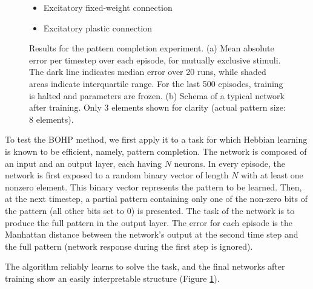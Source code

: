 \documentclass{article}
\begin{document}
\begin{figure}
\begin{subfigure}[t]{0.25\textwidth}
\end{subfigure}
\begin{minipage}[b]{0.25\textwidth}
\centering
\noindent
\begin{itemize}[leftmargin=*] %
\item[]\tikz{\path[very thick,->,draw=black] %
        (0,0) -- (1,0) ;}Excitatory fixed-weight connection
\item[]\tikz{\path[very thick,->,dashed,draw=black] %
        (0,0) -- (1,0) ;}Excitatory plastic connection
\end{itemize}
\end{minipage}
\caption{Results for the pattern completion experiment. (a) Mean absolute error per timestep over each episode, for mutually
exclusive stimuli. The dark line indicates median error
over 20 runs, while shaded areas indicate interquartile range. For the last 500
episodes, training is halted and parameters are frozen. (b) Schema of a
typical network after training. Only 3 elements shown for clarity (actual
pattern size: 8 elements). }
\label{fig:completion}
\end{figure}


To test the BOHP method, we first apply it to a task for which 
Hebbian learning is known to be efficient, namely, pattern completion. The
network is composed of an input and an output layer, each having $N$ neurons.
In every
episode, the network is first exposed to a random binary vector of length $N$
with at least one nonzero element. This binary vector represents the pattern to
be learned.
Then, at the next timestep, a partial pattern containing only one of the
non-zero bits of the pattern (all other bits set to 0) is presented. The task of
the network is to produce the full pattern in the output layer. The error for
each episode is the
Manhattan distance between the network's output at the second time step and the
full pattern (network response during the first step is ignored). 

The algorithm
reliably learns to solve the task, and the final networks after training show an
easily interpretable structure (Figure \ref{fig:completion}).
\end{document}
